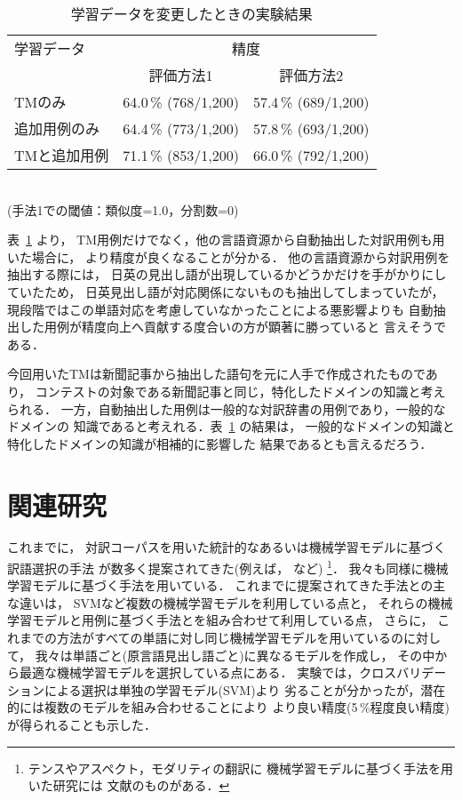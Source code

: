 \begin{table}[htbp]
  \begin{center}
    \caption{学習データを変更したときの実験結果}
    \label{table:exp:data}
    \begin{tabular}[c]{|l|l|l|}
      \hline
      学習データ & \multicolumn{2}{c|}{精度} \\
      \cline{2-3}
      & \multicolumn{1}{c|}{評価方法1} & \multicolumn{1}{c|}{評価方法2} \\
      \hline
      TMのみ       & 64.0\,\% (768/1,200) & 57.4\,\% (689/1,200) \\
      追加用例のみ & 64.4\,\% (773/1,200) & 57.8\,\% (693/1,200) \\
      TMと追加用例 & 71.1\,\% (853/1,200) & 66.0\,\% (792/1,200) \\
      \hline
    \end{tabular}\\
    \vspace*{1em}
    (手法1での閾値：類似度=1.0，分割数=0)
  \end{center}
\end{table}

表~\ref{table:exp:data} より，
TM用例だけでなく，他の言語資源から自動抽出した対訳用例も用いた場合に，
より精度が良くなることが分かる．
他の言語資源から対訳用例を抽出する際には，
日英の見出し語が出現しているかどうかだけを手がかりにしていたため，
日英見出し語が対応関係にないものも抽出してしまっていたが，
現段階ではこの単語対応を考慮していなかったことによる悪影響よりも
自動抽出した用例が精度向上へ貢献する度合いの方が顕著に勝っていると
言えそうである．

今回用いたTMは新聞記事から抽出した語句を元に人手で作成されたものであり，
コンテストの対象である新聞記事と同じ，特化したドメインの知識と考えられる．
一方，自動抽出した用例は一般的な対訳辞書の用例であり，一般的なドメインの
知識であると考えれる．表~\ref{table:exp:data} の結果は，
一般的なドメインの知識と特化したドメインの知識が相補的に影響した
結果であるとも言えるだろう．

\section{関連研究}
\label{sec:related_works}

これまでに，
対訳コーパスを用いた統計的なあるいは機械学習モデルに基づく訳語選択の手法
が数多く提案されてきた(例えば，
\cite{Brown:93,Hussein:94,HTanaka:94,berger:cl96}など)
\footnote{
  テンスやアスペクト，モダリティの翻訳に
  機械学習モデルに基づく手法を用いた研究には
  文献\cite{Murata2001d}のものがある．
}．
我々も同様に機械学習モデルに基づく手法を用いている．
これまでに提案されてきた手法との主な違いは，
SVMなど複数の機械学習モデルを利用している点と，
それらの機械学習モデルと用例に基づく手法とを組み合わせて利用している点，
さらに，
これまでの方法がすべての単語に対し同じ機械学習モデルを用いているのに対して，
我々は単語ごと(原言語見出し語ごと)に異なるモデルを作成し，
その中から最適な機械学習モデルを選択している点にある．
実験では，クロスバリデーションによる選択は単独の学習モデル(SVM)より
劣ることが分かったが，潜在的には複数のモデルを組み合わせることにより
より良い精度(5\,\%程度良い精度)が得られることも示した．

